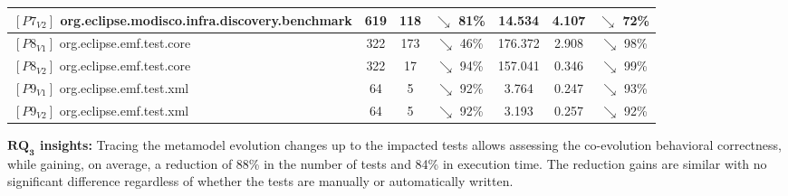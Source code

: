 \begin{table}
{\begin{tabular}{lcccccc}
		$[P7_{V2}]$ org.eclipse.modisco.infra.discovery.benchmark& 619 & 118 & \cellcolor{green!35}$\searrow$ 81\%  & 14.534 &4.107  & \cellcolor{green!25}$\searrow$ 72\% \\%
		\midrule
		
		$[P8_{V1}]$ org.eclipse.emf.test.core& 322 & 173 & \cellcolor{green!10}$\searrow$ 46\%  & 176.372 & 2.908 & \cellcolor{green!40}$\searrow$ 98\%  \\ 
		\midrule
		
		$[P8_{V2}]$ org.eclipse.emf.test.core& 322 & 17 & \cellcolor{green!40}$\searrow$ 94\%  & 157.041& 0.346 & \cellcolor{green!40}$\searrow$ 99\%  \\ 
		
		\midrule
		
		$[P9_{V1}]$ org.eclipse.emf.test.xml& 64 & 5 & \cellcolor{green!40}$\searrow$ 92\%  & 3.764 & 0.247 & \cellcolor{green!40}$\searrow$ 93\%  \\ 
		\midrule
		
		$[P9_{V2}]$ org.eclipse.emf.test.xml& 64 & 5 & \cellcolor{green!40}$\searrow$ 92\%  & 3.193 & 0.257 & \cellcolor{green!40}$\searrow$ 92\%  \\ 
		
		
		
		\bottomrule		
	\end{tabular}
}
\end{table}

\begin{tcolorbox}[boxsep=-2pt]
\textbf{$\boldsymbol{RQ_3}$ insights:}
Tracing the metamodel evolution changes up to the impacted tests allows assessing the co-evolution behavioral correctness, while %
gaining, on average, a reduction of 88\% in the number of tests and 84\% in execution time. The reduction gains are similar with no significant difference regardless of whether the tests are manually or automatically written.
\end{tcolorbox}




